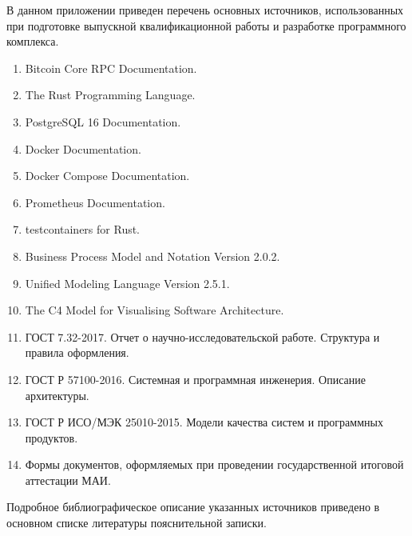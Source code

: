 
В данном приложении приведен перечень основных источников, использованных при
подготовке выпускной квалификационной работы и разработке программного
комплекса.

\begin{enumerate}
    \item Bitcoin Core RPC Documentation.
    \item The Rust Programming Language.
    \item PostgreSQL 16 Documentation.
    \item Docker Documentation.
    \item Docker Compose Documentation.
    \item Prometheus Documentation.
    \item testcontainers for Rust.
    \item Business Process Model and Notation Version 2.0.2.
    \item Unified Modeling Language Version 2.5.1.
    \item The C4 Model for Visualising Software Architecture.
    \item ГОСТ 7.32-2017. Отчет о научно-исследовательской работе. Структура и правила оформления.
    \item ГОСТ Р 57100-2016. Системная и программная инженерия. Описание архитектуры.
    \item ГОСТ Р ИСО/МЭК 25010-2015. Модели качества систем и программных продуктов.
    \item Формы документов, оформляемых при проведении государственной итоговой аттестации МАИ.
\end{enumerate}

Подробное библиографическое описание указанных источников приведено в основном
списке литературы пояснительной записки.
